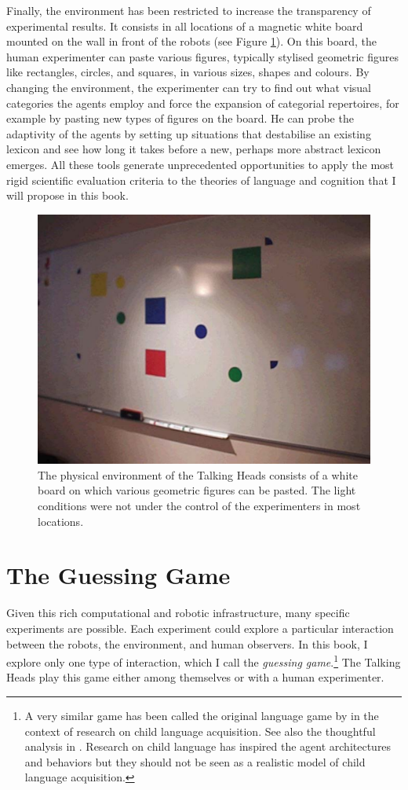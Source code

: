 Finally, the environment has been restricted to 
increase the transparency of experimental results. It 
consists in all locations of a magnetic white board mounted
on the wall in front of the robots (see Figure \ref{f:plate9}). On this
board, the human experimenter can paste various
figures, typically stylised geometric figures like 
rectangles, circles, and squares,
in various sizes, shapes and colours. By changing the 
environment, the experimenter can try to find out what
visual categories the agents employ and force the expansion 
of categorial repertoires, for example by pasting
new types of figures on the board. He can probe the 
adaptivity of the agents by setting up situations that 
destabilise an existing lexicon and see how long it 
takes before a new, perhaps more abstract lexicon emerges. 
All these tools generate unprecedented opportunities to apply 
the most rigid scientific evaluation criteria to the
theories of language and cognition that I will propose in this
book. 
\begin{figure}[htbp]
  \centerline{\includegraphics[width=.60\textwidth]{chap1/figs/Whiteboard}}
\caption{\small The physical environment of the Talking Heads  
consists of a white board on which various
geometric figures can be pasted. The light conditions were not under the control 
of the experimenters in most locations.}
\label{f:plate9}
\end{figure}

\section{The Guessing Game}

Given this rich computational and robotic infrastructure, many 
specific experiments are possible. 
Each experiment could explore
a particular interaction between the robots, the environment, 
and human observers. In this book, I explore only 
one type of interaction, which I call the
{\it guessing game}.\footnote{
A very similar game has been called the original 
language game by \cite{Brown:1973} in the context of
research on child language acquisition. See also 
the thoughtful analysis in \cite{Halliday:1975}. 
Research on child language has inspired the 
agent architectures and behaviors but they should not
be seen as a realistic model of child language acquisition.}
The Talking Heads play this game 
either among themselves or with a human experimenter. 

